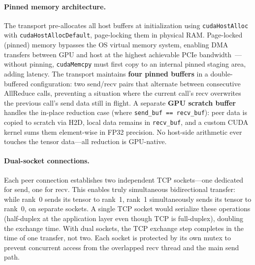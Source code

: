 \documentclass[10pt,twocolumn]{article}
\begin{document}
\paragraph{Pinned memory architecture.}
The transport pre-allocates all host buffers at initialization using
\texttt{cudaHostAlloc} with \texttt{cudaHostAllocDefault}, page-locking
them in physical RAM\@.  Page-locked (pinned) memory bypasses the OS
virtual memory system, enabling DMA transfers between GPU and host at the
highest achievable PCIe bandwidth~\citep{nvidia2024cudaguide}---without
pinning, \texttt{cudaMemcpy} must first copy to an internal pinned staging
area, adding latency.  The transport maintains \textbf{four pinned
buffers} in a double-buffered configuration: two send/recv pairs that
alternate between consecutive AllReduce calls, preventing a situation where
the current call's recv overwrites the previous call's send data still in
flight.  A separate \textbf{GPU scratch buffer} handles the in-place
reduction case (where \texttt{send\_buf == recv\_buf}): peer data is
copied to scratch via H2D, local data remains in \texttt{recv\_buf}, and a
custom CUDA kernel sums them element-wise in FP32 precision.  No host-side
arithmetic ever touches the tensor data---all reduction is GPU-native.

\paragraph{Dual-socket connections.}
Each peer connection establishes two independent TCP sockets---one
dedicated for send, one for recv.  This enables truly simultaneous
bidirectional transfer: while rank~0 sends its tensor to rank~1, rank~1
simultaneously sends its tensor to rank~0, on separate sockets.  A single
TCP socket would serialize these operations (half-duplex at the application
layer even though TCP is full-duplex), doubling the exchange time.  With
dual sockets, the TCP exchange step completes in the time of one transfer,
not two.  Each socket is protected by its own mutex to prevent concurrent
access from the overlapped recv thread and the main send path.
\end{document}
